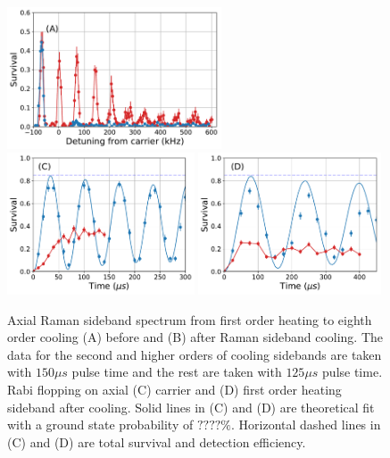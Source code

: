 \documentclass[aps,prl,twocolumn,groupedaddress]{revtex4-1}
\begin{document}
\begin{figure}
  \includegraphics[height=4.2cm]{imgs/spectrum_a1.pdf}
  \includegraphics[height=4.2cm]{imgs/rabi_flop_a1_0.pdf}
  \includegraphics[height=4.2cm]{imgs/rabi_flop_a1_p1.pdf}
  \caption{Axial Raman sideband spectrum from first order heating to eighth order cooling
    (A) before and (B) after Raman sideband cooling.
    The data for the second and higher orders of cooling sidebands are taken with $150\mu s$
    pulse time and the rest are taken with $125\mu s$ pulse time.
    Rabi flopping on axial (C) carrier and (D) first order heating sideband
    after cooling.
    Solid lines in (C) and (D) are theoretical fit with a ground state probability of $????\%$.
    Horizontal dashed lines in (C) and (D) are total survival and detection efficiency.
    \label{f-axial}}
\end{figure}
\end{document}

